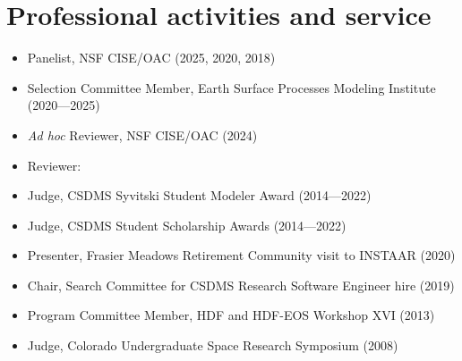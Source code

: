 \section{Professional activities and service}
\vspace{0.5em}

\begin{itemize}

  \item Panelist, NSF CISE/OAC (2025, 2020, 2018)

  \item Selection Committee Member, Earth Surface Processes Modeling Institute (2020---2025)

  \item \textit{Ad hoc} Reviewer, NSF CISE/OAC (2024)

  \item Reviewer:

  \item Judge, CSDMS Syvitski Student Modeler Award (2014---2022)

  \item Judge, CSDMS Student Scholarship Awards (2014---2022)

  \item Presenter, Frasier Meadows Retirement Community visit to INSTAAR (2020)

  \item Chair, Search Committee for CSDMS Research Software Engineer hire (2019)

  \item Program Committee Member, HDF and HDF-EOS Workshop XVI (2013)

  \item Judge, Colorado Undergraduate Space Research Symposium (2008)

\end{itemize}
